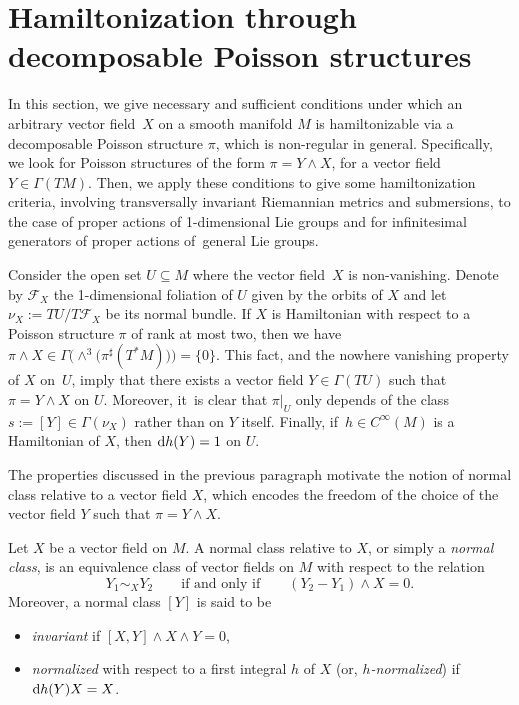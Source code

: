\documentclass[pdftex]{sigma}%
\newcommand{\dd}{{\rm d}}
\numberwithin{equation}{section}
\begin{document}
\section{Hamiltonization through decomposable Poisson structures}\label{sec:HamGood}

In this section, we give necessary and sufficient conditions under which an arbitrary vector field~$X$ on a smooth manifold $M$ is hamiltonizable via a decomposable Poisson structure $\pi$, which is non-regular in general. Specifically, we look for Poisson structures of the form $\pi = Y \wedge X$, for a vector field $Y \in \Gamma(TM)$. Then, we apply these conditions to give some hamiltonization criteria, involving transversally invariant Riemannian metrics and submersions, to the case of proper actions of 1-dimensional Lie groups and for infinitesimal generators of proper actions of~general Lie groups.

Consider the open set $U \subseteq M$ where the vector field~$X$ is non-vanishing. Denote by $\mathcal{F}_{X}$ the 1-dimensional foliation of $U$ given by the orbits of $X$ and let $\nu_{X} := TU/T\mathcal{F}_{X}$ be its normal bundle. If $X$ is Hamiltonian with respect to a Poisson structure $\pi$ of rank at most two, then we have $\pi \wedge X \in \Gamma\big({\wedge}^{3}\big(\pi^{\sharp}(T^{*}M)\big)\big) = \{0\}$. This fact, and the nowhere vanishing property of $X$ on~$U$, imply that there exists a vector field $Y \in \Gamma(TU)$ such that $\pi = Y \wedge X$ on $U$. Moreover, it~is clear that $\pi|_{U}$ only depends of the class $s := [Y] \in \Gamma(\nu_{X})$ rather than on $Y$ itself. Finally, if~$h \in C^{\infty}(M)$ is a Hamiltonian of $X$, then $\dd h(Y) = 1$ on $U$.

The properties discussed in the previous paragraph motivate the notion of normal class relative to a vector field $X$, which encodes the freedom of the choice of the vector field $Y$ such that $\pi = Y \wedge X$.

\begin{Definition}
Let $X$ be a vector field on $M$. A normal class relative to $X$, or simply a \emph{normal class}, is an equivalence class of vector fields on $M$ with respect to the relation
 \begin{equation*}
 Y_1 \sim_{X} Y_2 \qquad \text{if and only if} \qquad (Y_2 - Y_1) \wedge X = 0.
 \end{equation*}
Moreover, a normal class $[Y]$ is said to be
 \begin{itemize}\itemsep=0pt
 \item \emph{invariant} if $[X,Y] \wedge X \wedge Y=0$,
 \item \emph{normalized} with respect to a first integral $h$ of $X$ (or, \emph{$h$-normalized}) if $\dd h(Y)X=X$.
 \end{itemize}
\end{Definition}
\end{document}

